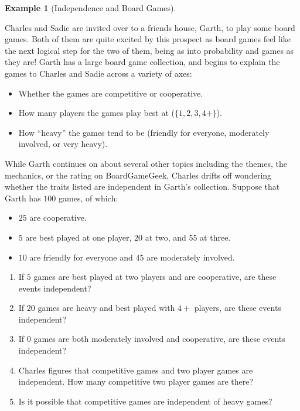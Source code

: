 \documentclass[
  letterpaper,
  DIV=11,
  numbers=noendperiod]{scrreprt}
\providecommand{\tightlist}{%
  \setlength{\itemsep}{0pt}\setlength{\parskip}{0pt}}\usepackage{longtable,booktabs,array}
\theoremstyle{definition}
\theoremstyle{definition}
\newtheorem{example}{Example}[chapter]
\theoremstyle{definition}
\theoremstyle{remark}
\begin{document}
\begin{example}[Independence and Board
Games]\protect\hypertarget{exm-assessing-independence}{}\label{exm-assessing-independence}

Charles and Sadie are invited over to a friends house, Garth, to play
some board games. Both of them are quite excited by this prospect as
board games feel like the next logical step for the two of them, being
as into probability and games as they are! Garth has a large board game
collection, and begins to explain the games to Charles and Sadie across
a variety of axes:

\begin{itemize}
\tightlist
\item
  Whether the games are competitive or cooperative.
\item
  How many players the games play best at (\(\{1, 2, 3, 4+\}\)).
\item
  How ``heavy'' the games tend to be (friendly for everyone, moderately
  involved, or very heavy).
\end{itemize}

While Garth continues on about several other topics including the
themes, the mechanics, or the rating on BoardGameGeek, Charles drifts
off wondering whether the traits listed are independent in Garth's
collection. Suppose that Garth has \(100\) games, of which:

\begin{itemize}
\tightlist
\item
  \(25\) are cooperative.
\item
  \(5\) are best played at one player, \(20\) at two, and \(55\) at
  three.
\item
  \(10\) are friendly for everyone and \(45\) are moderately involved.
\end{itemize}

\begin{enumerate}
\def\labelenumi{\alph{enumi}.}
\tightlist
\item
  If \(5\) games are best played at two players and are cooperative, are
  these events independent?
\item
  If \(20\) games are heavy and best played with \(4+\) players, are
  these events independent?
\item
  If \(0\) games are both moderately involved and cooperative, are these
  events independent?
\item
  Charles figures that competitive games and two player games are
  independent. How many competitive two player games are there?
\item
  Is it possible that competitive games are independent of heavy games?
\end{enumerate}


\end{example}
\end{document}
